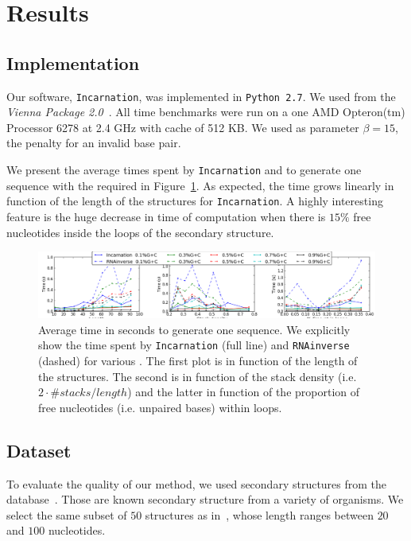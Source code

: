 \section{Results}
\label{sec:results}

\subsection{Implementation}
\label{sec:implementation}
Our software, \texttt{Incarnation}, was implemented in {\tt Python~2.7}. We used
\RNAinverse from the \textit{Vienna Package 2.0}~\cite{Hofacker:1994}.
All time benchmarks were run on a one AMD Opteron(tm) Processor 6278  at 2.4 GHz with cache of 512 KB.
 We used as parameter $\beta=15$, the penalty for an invalid base pair.



We present the average times spent by \texttt{Incarnation} and \RNAinverse to generate one sequence
with the required \GCContent in Figure~\ref{fig:time}. As expected, the time grows linearly
in function of the length of the structures for \texttt{Incarnation}.  A highly interesting feature
is the huge decrease in time of computation when there is $15\%$ free 
nucleotides inside the loops of the secondary structure.

\begin{figure}[ht!]
	\centering
	\includegraphics[width=\textwidth]{Figures/time_rnastrand_clustered_rnainverse_100samples_fix}
	\caption{Average time in seconds to generate one sequence. We explicitly show 
	the time spent by \texttt{Incarnation} (full line) and \texttt{RNAinverse} (dashed) for various \GCContent. The first plot is in function
	of the length of the structures. The second is in function of the stack
	density (i.e. $2\cdot\#stacks/length$) and the latter in function of 
	the proportion of free nucleotides (i.e. unpaired bases) within loops.}
	\label{fig:time}	
\end{figure}



\subsection{Dataset}
To evaluate the quality of our method, we used secondary
structures from the \RNASTRAND database~\cite{andronescu2008rna}.
Those are known secondary structure from a variety of organisms.
We select the same subset of $50$ structures as in~\cite{Levin:2012kx}, 
whose length ranges between $20$ and $100$ nucleotides. 

